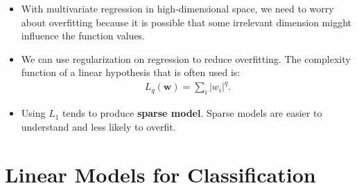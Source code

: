 \documentclass[10pt]{article}
\begin{document}
\begin{itemize}
    \item With multivariate regression in high-dimensional space, 
        we need to worry about overfitting because it is
        possible that some irrelevant dimension migght 
        influence the function values.
    
    \item We can use regularization on regression to reduce
        overfitting. The complexity function of a linear 
        hypothesis that is often used is:
        \begin{align*}
            L_q(\mathbf{w}) = \sum_{i} |w_i|^q.
        \end{align*}
    
    \item Using $L_1$ tends to produce {\bf sparse model}.
        Sparse models are easier to understand and less likely
        to overfit.
\end{itemize}

\section{Linear Models for Classification}
\end{document}
